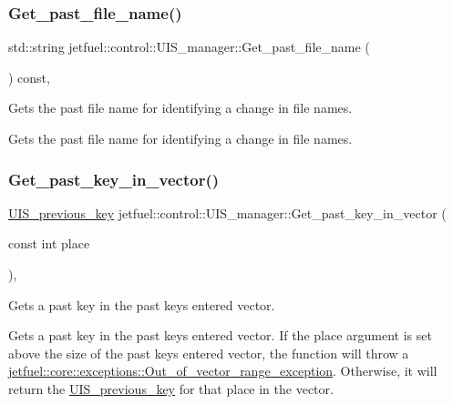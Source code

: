 \subsubsection{\texorpdfstring{Get\+\_\+past\+\_\+file\+\_\+name()}{Get\_past\_file\_name()}}
{\footnotesize\ttfamily std\+::string jetfuel\+::control\+::\+U\+I\+S\+\_\+manager\+::\+Get\+\_\+past\+\_\+file\+\_\+name (\begin{DoxyParamCaption}{ }\end{DoxyParamCaption}) const\hspace{0.3cm}{\ttfamily [inline]}, {\ttfamily [protected]}}



Gets the past file name for identifying a change in file names. 

Gets the past file name for identifying a change in file names. \mbox{\label{classjetfuel_1_1control_1_1UIS__manager_ac7dc1ae00609d95ba770813d7cbe6846}} 
\subsubsection{\texorpdfstring{Get\+\_\+past\+\_\+key\+\_\+in\+\_\+vector()}{Get\_past\_key\_in\_vector()}}
{\footnotesize\ttfamily \hyperlink{structjetfuel_1_1control_1_1UIS__previous__key}{U\+I\+S\+\_\+previous\+\_\+key} jetfuel\+::control\+::\+U\+I\+S\+\_\+manager\+::\+Get\+\_\+past\+\_\+key\+\_\+in\+\_\+vector (\begin{DoxyParamCaption}\item[{const int}]{place }\end{DoxyParamCaption})\hspace{0.3cm}{\ttfamily [inline]}, {\ttfamily [protected]}}



Gets a past key in the past keys entered vector. 

Gets a past key in the past keys entered vector. If the place argument is set above the size of the past keys entered vector, the function will throw a \hyperlink{classjetfuel_1_1core_1_1exceptions_1_1Out__of__vector__range__exception}{jetfuel\+::core\+::exceptions\+::\+Out\+\_\+of\+\_\+vector\+\_\+range\+\_\+exception}. Otherwise, it will return the \hyperlink{structjetfuel_1_1control_1_1UIS__previous__key}{U\+I\+S\+\_\+previous\+\_\+key} for that place in the vector.


